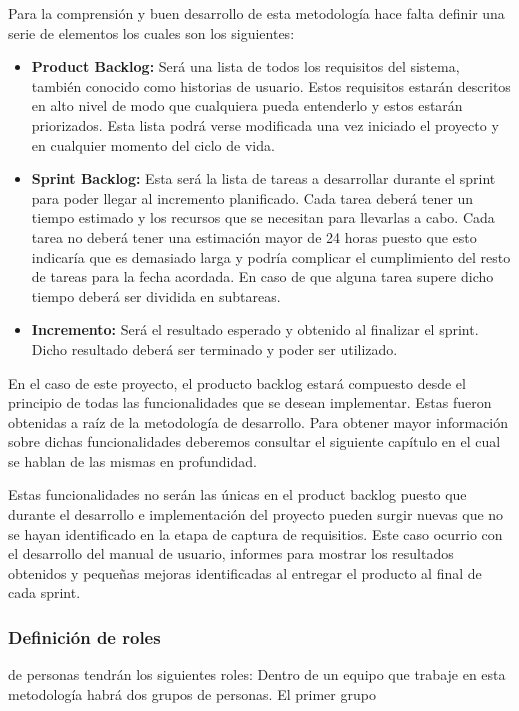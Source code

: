 Para la comprensión y buen desarrollo de esta metodología hace falta definir una serie
 de elementos los cuales son los siguientes:

\begin{itemize}
  \item \textbf{Product Backlog:} Será una lista de todos los requisitos del sistema, también
     conocido como historias de usuario. Estos requisitos estarán descritos en alto nivel
     de modo que cualquiera pueda entenderlo y estos estarán priorizados. Esta lista
     podrá verse modificada una vez iniciado el proyecto y en cualquier momento del ciclo de vida.
  \item \textbf{Sprint Backlog:} Esta será la lista de tareas a desarrollar durante el sprint
     para poder llegar al incremento planificado. Cada tarea deberá tener un tiempo estimado
     y los recursos que se necesitan para llevarlas a cabo. Cada tarea no deberá tener una
     estimación mayor de 24 horas puesto que esto indicaría que es demasiado larga y podría
     complicar el cumplimiento del resto de tareas para la fecha acordada. En caso de que
     alguna tarea supere dicho tiempo deberá ser dividida en subtareas.
  \item \textbf{Incremento:} Será el resultado esperado y obtenido al finalizar el sprint. Dicho
     resultado deberá ser terminado y poder ser utilizado.
\end{itemize}

En el caso de este proyecto, el producto backlog estará compuesto desde el principio de todas
 las funcionalidades que se desean implementar. Estas fueron obtenidas a raíz de la metodología
 de desarrollo. Para obtener mayor información sobre dichas funcionalidades deberemos consultar
 el siguiente capítulo en el cual se hablan de las mismas en profundidad.

Estas funcionalidades no serán las únicas en el product backlog puesto que durante el desarrollo
 e implementación del proyecto pueden surgir nuevas que no se hayan identificado en la etapa
 de captura de requisitios. Este caso ocurrio con el desarrollo del manual de usuario,
 informes para mostrar los resultados obtenidos y pequeñas mejoras identificadas al entregar
 el producto al final de cada sprint.

\subsubsection{Definición de roles}

 de personas tendrán los siguientes roles:
Dentro de un equipo que trabaje en esta metodología habrá dos grupos de personas. El primer grupo

